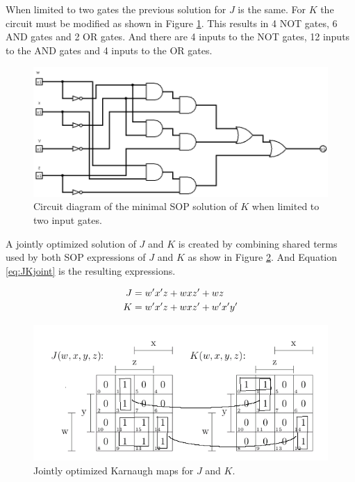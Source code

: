 \documentclass[12pt]{article}
\begin{document}
When limited to two gates the previous solution for $J$ is the
same.
For $K$ the circuit must be modified as shown in Figure \ref{fig:Kminsop-02}.
This results in 4 NOT gates, 6 AND gates and 2 OR gates.
And there are 4 inputs to the NOT gates, 12 inputs to the AND gates
and 4 inputs to the OR gates.

\begin{figure}[tbp]
\center
\includegraphics[scale=0.5]{Kminsop-02}
\caption{Circuit diagram of the minimal SOP solution of $K$ when limited to two input gates.}
\label{fig:Kminsop-02}
\end{figure}
\clearpage

A jointly optimized solution of $J$ and $K$ is created by combining shared
terms used by both SOP expressions of $J$ and $K$ as show in
Figure \ref{fig:JKjointkmap}.
And Equation \ref{eq:JKjoint} is the resulting expressions.

\begin{align}
J &= w'x'z + wxz' + wz \notag \\
K &= w'x'z + wxz' + w'x'y' \label{eq:JKjoint}
\end{align}
\begin{figure}[tbp]
\center
\includegraphics[scale=0.60]{JKkmap-01}
\caption{Jointly optimized Karnaugh maps for $J$ and $K$.}
\label{fig:JKjointkmap}
\end{figure}
\end{document}
